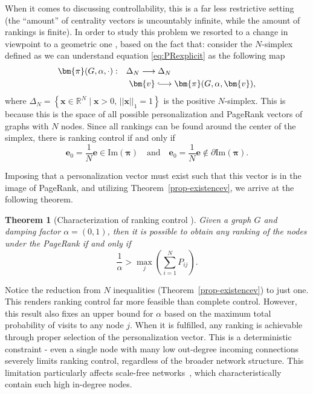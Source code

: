 \documentclass[sn-mathphys-ay]{sn-jnl}%
\newcommand{\R}{\mathbb{R}}
\theoremstyle{thmstyleone}%
\newtheorem{theorem}{Theorem}%
\theoremstyle{thmstyletwo}%
\theoremstyle{thmstylethree}%
\begin{document}
When it comes to discussing controllability, this is a far less restrictive setting (the ``amount'' of centrality vectors is uncountably infinite, while the amount of rankings is finite). In order to study this problem we resorted to a change in viewpoint to a geometric one \cite{contrerasaso2023pagerank}, based on the fact that: consider the $N$-simplex defined as we can understand equation \eqref{eq:PRexplicit} as the following map
\begin{align}\label{eq-PRmap}
	\bm{\pi}(G, \alpha, \cdot):&\quad  \Delta_N \longrightarrow \Delta_N \nonumber \\
	&\quad\,\, \bm{v} \lhook\joinrel\longrightarrow \bm{\pi}(G, \alpha, \bm{v}),
\end{align}
where $\Delta_N = \left\{\bm{x} \in \R^N  \; | \; \bm{x}>0,\, ||\bm{x}||_1=1 \right\}$ is the positive $N$-simplex. This is because this is the space of all possible personalization and PageRank vectors of graphs with $N$ nodes. Since all rankings can be found around the center of the simplex, there is ranking control if and only if
\begin{equation}\label{eq-rankingcenter}
	\bm{e}_0= \frac{1}{N}\bm{e} \in \textrm{Im}(\bm{\pi}) \quad \text{and}\quad \bm{e}_0 = \frac{1}{N} \bm{e} \notin \partial \textrm{Im}(\bm{\pi}).
\end{equation}

Imposing that a personalization vector must exist such that this vector is in the image of PageRank, and utilizing Theorem~\ref{prop-existencev}, we arrive at the following theorem.


\begin{theorem}[Characterization of ranking control \cite{contrerasaso2023pagerank}]\label{thm:ranking}
	Given a graph $G$ and damping factor $\alpha=(0,1)$, then it is possible to obtain any ranking of the nodes under the PageRank if and only if
	\begin{equation}\label{eq-necessary}
		\frac{1}{\alpha} > \max_j\left(\sum_{i=1}^N P_{ij}\right).
	\end{equation}
\end{theorem}


Notice the reduction from $N$ inequalities (Theorem~\ref{prop-existencev}) to just one. This renders ranking control far more feasible than complete control. However, this result also fixes an upper bound for $\alpha$ based on the maximum total probability of visits to any node $j$. When it is fulfilled, any ranking is achievable through proper selection of the personalization vector. This is a deterministic constraint - even a single node with many low out-degree incoming connections severely limits ranking control, regardless of the broader network structure. This limitation particularly affects scale-free networks~\cite{barabasi1999emergence}, which characteristically contain such high in-degree nodes.
\end{document}
